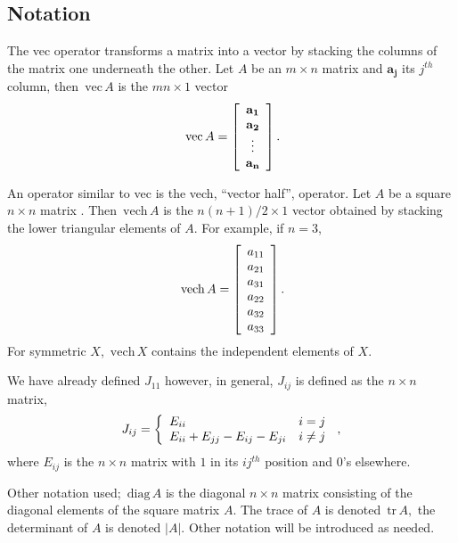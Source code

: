 \documentclass[12pt]{article}
\begin{document}
\subsection{Notation}

The vec operator transforms a matrix into a vector by stacking the columns of
the matrix one underneath the other. Let $A$ be an $m\times n$ matrix and
$\mathbf{a_{j}}$ its $j^{th}$ column, then $\,\mathrm{vec}\,A$ 
is the $mn\times1$ vector
\begin{equation}
\,\mathrm{vec}\,A=\left[
\begin{array}
[c]{c}%
\mathbf{a_{1}}\\
\mathbf{a_{2}}\\
\vdots\\
\mathbf{a_{n}}%
\end{array}
\right]  .
\end{equation}

An operator similar to vec is the vech, ``vector half'', operator. Let $A$ be
a square $n\times n$ matrix . Then $\,\mathrm{vech}\,A$ is the $n\left(
n+1\right)  /2\times1$ vector obtained by stacking the lower triangular
elements of $A$. For example, if $n=3$,
\begin{equation}
\,\mathrm{vech}\,A=\left[
\begin{array}
[c]{c}%
a_{11}\\
a_{21}\\
a_{31}\\
a_{22}\\
a_{32}\\
a_{33}%
\end{array}
\right]  .
\end{equation}
For symmetric $X$, $\,\mathrm{vech}\,X$ contains the independent elements of
$X$.

We have already defined $J_{11}$ however, in general, $J_{ij}$ is defined as
the $n\times n$ matrix,
\begin{equation}
J_{ij}=\left\{
\begin{array}
[c]{ll}%
E_{ii} & i=j\\
E_{ii}+E_{jj}-E_{ij}-E_{ji} & i\neq j
\end{array}
\right.  \,,\label{Jij}%
\end{equation}
where $E_{ij}$ is the $n\times n$ matrix with $1$ in its $ij^{th}$ position
and $0$'s elsewhere.

Other notation used; $\,\mathrm{diag}\,A$ is the diagonal $n\times n$ matrix
consisting of the diagonal elements of the square matrix $A.$ The trace of $A
$ is denoted $\,\mathrm{tr}\,A,$ the determinant of $A$ is denoted $|A|$.
Other notation will be introduced as needed.
\end{document}
